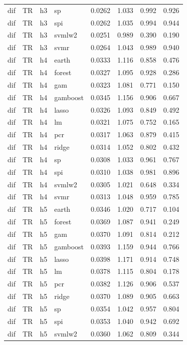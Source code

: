 \begin{ThreePartTable}
\begin{longtable}[t]{llclcccc}
dif & TR & h3 & sp & 0.0262 & 1.033 & 0.992 & 0.926\\
dif & TR & h3 & spi & 0.0262 & 1.035 & 0.994 & 0.944\\
dif & TR & h3 & svmlw2 & 0.0251 & 0.989 & 0.390 & 0.190\\
dif & TR & h3 & svmr & 0.0264 & 1.043 & 0.989 & 0.940\\
\addlinespace
dif & TR & h4 & earth & 0.0333 & 1.116 & 0.858 & 0.476\\
dif & TR & h4 & forest & 0.0327 & 1.095 & 0.928 & 0.286\\
dif & TR & h4 & gam & 0.0323 & 1.081 & 0.771 & 0.150\\
dif & TR & h4 & gamboost & 0.0345 & 1.156 & 0.906 & 0.667\\
dif & TR & h4 & lasso & 0.0326 & 1.093 & 0.849 & 0.492\\
dif & TR & h4 & lm & 0.0321 & 1.075 & 0.752 & 0.165\\
dif & TR & h4 & pcr & 0.0317 & 1.063 & 0.879 & 0.415\\
dif & TR & h4 & ridge & 0.0314 & 1.052 & 0.802 & 0.432\\
dif & TR & h4 & sp & 0.0308 & 1.033 & 0.961 & 0.767\\
dif & TR & h4 & spi & 0.0310 & 1.038 & 0.981 & 0.896\\
dif & TR & h4 & svmlw2 & 0.0305 & 1.021 & 0.648 & 0.334\\
dif & TR & h4 & svmr & 0.0313 & 1.048 & 0.959 & 0.785\\
\addlinespace
dif & TR & h5 & earth & 0.0346 & 1.020 & 0.717 & 0.104\\
dif & TR & h5 & forest & 0.0369 & 1.087 & 0.941 & 0.249\\
dif & TR & h5 & gam & 0.0370 & 1.091 & 0.814 & 0.212\\
dif & TR & h5 & gamboost & 0.0393 & 1.159 & 0.944 & 0.766\\
dif & TR & h5 & lasso & 0.0398 & 1.171 & 0.914 & 0.748\\
dif & TR & h5 & lm & 0.0378 & 1.115 & 0.804 & 0.178\\
dif & TR & h5 & pcr & 0.0382 & 1.126 & 0.906 & 0.537\\
dif & TR & h5 & ridge & 0.0370 & 1.089 & 0.905 & 0.663\\
dif & TR & h5 & sp & 0.0354 & 1.042 & 0.957 & 0.804\\
dif & TR & h5 & spi & 0.0353 & 1.040 & 0.942 & 0.692\\
dif & TR & h5 & svmlw2 & 0.0360 & 1.062 & 0.809 & 0.344\\

\end{longtable}
\end{ThreePartTable}
